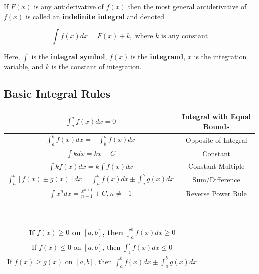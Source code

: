        \noindent If $F(x)$ is any antiderivative of $f(x)$ then the most general antiderivative
        of $f(x)$ is called an \textbf{indefinite integral} and denoted

        \begin{equation*}
            \int f(x)dx = F(x) + k,\text{    where $k$ is any constant}
        \end{equation*}

        \noindent Here, $\int$ is the \textbf{integral symbol}, $f(x)$ is the \textbf{integrand},
        $x$ is the integration variable, and $k$ is the constant of integration. \\



    \subsection{Basic Integral Rules}
        \begin{center}
            \begin{tabular}{|c|c|}
                \hline
                $\int^a_a f(x) dx = 0$ & Integral with Equal Bounds \\
                \hline
                $\int^b_a f(x)dx = -\int^a_b f(x)dx$ & Opposite of Integral \\
                \hline
                $\int k dx = kx + C$ & Constant \\
                \hline
                $\int kf(x)dx = k\int f(x)dx$ & Constant Multiple \\
                \hline
                $\int^b_a[f(x)\pm g(x)]dx = \int^b_a f(x)dx\pm\int^b_a g(x)dx$ & Sum/Difference \\
                \hline
                $\int x^n dx = \frac{x^{n+1}}{n+1}+C, n\not =-1$ & Reverse Power Rule \\
                \hline
            \end{tabular}
        \end{center} \\

        \begin{center}
            \begin{tabular}{|c|}
                \hline
                If $f(x)\geq 0$ on $[a,b]$, then $\int^b_a f(x)dx\geq 0$  \\
                \hline
                If $f(x)\leq 0$ on $[a,b]$, then $\int^b_a f(x)dx\leq 0$  \\
                \hline
                If $f(x)\geq g(x)$ on $[a,b]$, then $\int^b_a f(x)dx\pm\int^b_a g(x)dx$  \\
                \hline
            \end{tabular}
        \end{center}


